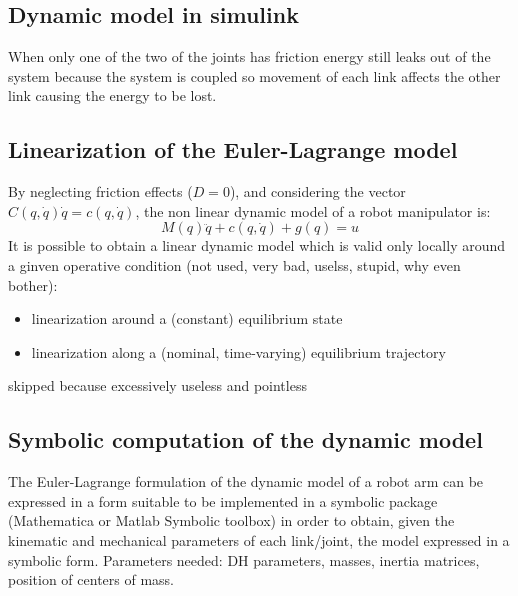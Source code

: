 \documentclass{book}
\begin{document}
\subsection{Dynamic model in simulink}
When only one of the two of the joints has friction energy still leaks out of the system because the system is coupled so movement of each link affects the other link causing the energy to be lost.
\subsection{Linearization of the Euler-Lagrange model}
By neglecting friction effects ($D=0$), and considering the vector $C(q,\dot{q})\dot{q} = c(q,\dot{q})$, the non linear dynamic model of a robot manipulator is:
\[
    M(q)\ddot{q}+c(q,\dot{q})+g(q)=u
\]
It is possible to obtain a linear dynamic model which is valid only locally around a ginven operative condition (not used, very bad, uselss, stupid, why even bother):
\begin{itemize}
    \item linearization around a (constant) equilibrium state 
    \item linearization along a (nominal, time-varying) equilibrium trajectory
\end{itemize}
skipped because excessively useless and pointless


\subsection{Symbolic computation of the dynamic model}
The Euler-Lagrange formulation of the dynamic model of a robot arm can be expressed in a form suitable to be implemented in a symbolic package (Mathematica or Matlab Symbolic toolbox) in order to obtain, given the kinematic and mechanical parameters of each link/joint, the model expressed in a symbolic form. Parameters needed: DH parameters, masses, inertia matrices, position of centers of mass.
\end{document}
